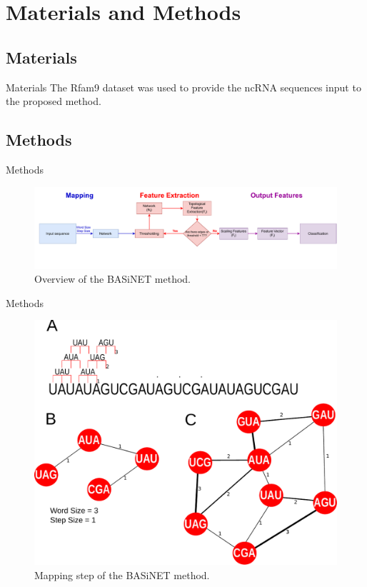 \documentclass[10pt]{beamer}
\begin{document}
\section{Materials and Methods}

\subsection{Materials}

\begin{frame}{Materials}
    The Rfam9 dataset \cite{Gardner2010} was used to provide the ncRNA sequences input to the proposed method. 
\end{frame}

\subsection{Methods}

\begin{frame}{Methods}
\begin{figure}[!ht]
	\centering
	\includegraphics[scale=0.4]{fig/overview.pdf}
	\caption{Overview of the BASiNET method.}
	\label{fig:overview}
\end{figure}  
\end{frame}

\begin{frame}{Methods}
\begin{figure}[!ht]
	\centering
	\includegraphics[scale=0.4]{fig/mapping.pdf}
	\caption{Mapping step of the BASiNET method.}
	\label{fig:overview}
\end{figure}  
\end{frame}
\end{document}
